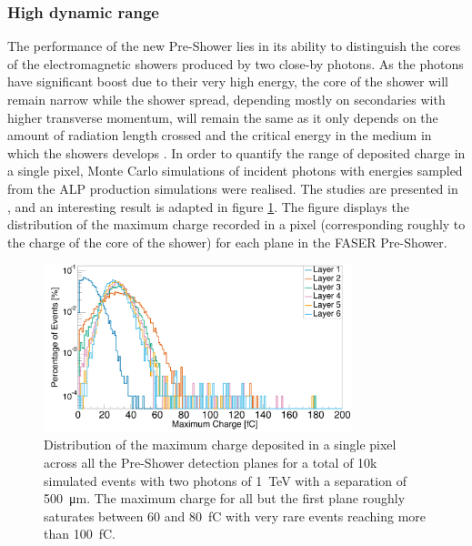 		\subsubsection{High dynamic range}
		The performance of the new Pre-Shower lies in its ability to distinguish the cores of the electromagnetic showers produced by two close-by photons. As the photons have significant boost due to their very high energy, the core of the shower will remain narrow while the shower spread, depending mostly on secondaries with higher transverse momentum, will remain the same as it only depends on the amount of radiation length crossed and the critical energy in the medium in which the showers develops \cite{PDG}. In order to quantify the range of deposited charge in a single pixel, Monte Carlo simulations of incident photons with energies sampled from the ALP production simulations were realised. The studies are presented in \cite{Kotitsa_thesis}, and an interesting result is adapted in figure \ref{im:charge_per_plane_FASER}. The figure displays the distribution of the maximum charge recorded in a pixel (corresponding roughly to the charge of the core of the shower) for each plane in the FASER Pre-Shower.
		
		\begin{figure}[h]
			\centering
			\includegraphics[width=0.8\textwidth]{files/charge_per_plane_FASER}
			\caption{Distribution of the maximum charge deposited in a single pixel across all the Pre-Shower detection planes for a total of 10k simulated events with two photons of \SI{1}{\tera\electronvolt} with a separation of \SI{500}{\micro\meter}. The maximum charge for all but the first plane roughly saturates between 60 and \SI{80}{\femto\coulomb} with very rare events reaching more than \SI{100}{\femto\coulomb}.}
			\label{im:charge_per_plane_FASER}
		\end{figure}
		
